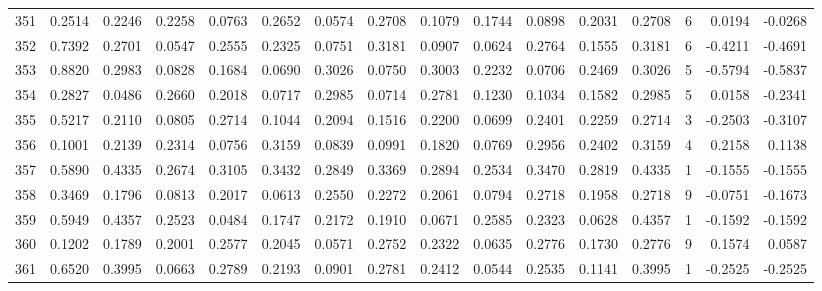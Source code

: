 \begin{tabular}{lrrrrrrrrrrrrrrr}
351 &      0.2514 &  0.2246 &  0.2258 &  0.0763 &  0.2652 &  0.0574 &  0.2708 &  0.1079 &  0.1744 &  0.0898 &   0.2031 &     0.2708 &      6 &                    0.0194 &                    -0.0268 \\
352 &      0.7392 &  0.2701 &  0.0547 &  0.2555 &  0.2325 &  0.0751 &  0.3181 &  0.0907 &  0.0624 &  0.2764 &   0.1555 &     0.3181 &      6 &                   -0.4211 &                    -0.4691 \\
353 &      0.8820 &  0.2983 &  0.0828 &  0.1684 &  0.0690 &  0.3026 &  0.0750 &  0.3003 &  0.2232 &  0.0706 &   0.2469 &     0.3026 &      5 &                   -0.5794 &                    -0.5837 \\
354 &      0.2827 &  0.0486 &  0.2660 &  0.2018 &  0.0717 &  0.2985 &  0.0714 &  0.2781 &  0.1230 &  0.1034 &   0.1582 &     0.2985 &      5 &                    0.0158 &                    -0.2341 \\
355 &      0.5217 &  0.2110 &  0.0805 &  0.2714 &  0.1044 &  0.2094 &  0.1516 &  0.2200 &  0.0699 &  0.2401 &   0.2259 &     0.2714 &      3 &                   -0.2503 &                    -0.3107 \\
356 &      0.1001 &  0.2139 &  0.2314 &  0.0756 &  0.3159 &  0.0839 &  0.0991 &  0.1820 &  0.0769 &  0.2956 &   0.2402 &     0.3159 &      4 &                    0.2158 &                     0.1138 \\
357 &      0.5890 &  0.4335 &  0.2674 &  0.3105 &  0.3432 &  0.2849 &  0.3369 &  0.2894 &  0.2534 &  0.3470 &   0.2819 &     0.4335 &      1 &                   -0.1555 &                    -0.1555 \\
358 &      0.3469 &  0.1796 &  0.0813 &  0.2017 &  0.0613 &  0.2550 &  0.2272 &  0.2061 &  0.0794 &  0.2718 &   0.1958 &     0.2718 &      9 &                   -0.0751 &                    -0.1673 \\
359 &      0.5949 &  0.4357 &  0.2523 &  0.0484 &  0.1747 &  0.2172 &  0.1910 &  0.0671 &  0.2585 &  0.2323 &   0.0628 &     0.4357 &      1 &                   -0.1592 &                    -0.1592 \\
360 &      0.1202 &  0.1789 &  0.2001 &  0.2577 &  0.2045 &  0.0571 &  0.2752 &  0.2322 &  0.0635 &  0.2776 &   0.1730 &     0.2776 &      9 &                    0.1574 &                     0.0587 \\
361 &      0.6520 &  0.3995 &  0.0663 &  0.2789 &  0.2193 &  0.0901 &  0.2781 &  0.2412 &  0.0544 &  0.2535 &   0.1141 &     0.3995 &      1 &                   -0.2525 &                    -0.2525 \\

\end{tabular}
